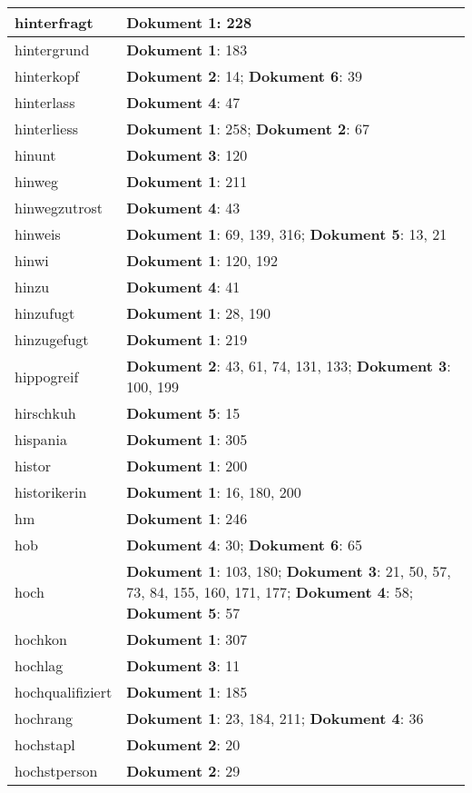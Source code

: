 \documentclass[a5paper]{article}
\begin{document}
\begin{longtable}[l]{|l|p{3in}|}
\hline
hinterfragt & \textbf{Dokument 1}: 228 \\
\hline
hintergrund & \textbf{Dokument 1}: 183 \\
\hline
hinterkopf & \textbf{Dokument 2}: 14; \textbf{Dokument 6}: 39 \\
\hline
hinterlass & \textbf{Dokument 4}: 47 \\
\hline
hinterliess & \textbf{Dokument 1}: 258; \textbf{Dokument 2}: 67 \\
\hline
hinunt & \textbf{Dokument 3}: 120 \\
\hline
hinweg & \textbf{Dokument 1}: 211 \\
\hline
hinwegzutrost & \textbf{Dokument 4}: 43 \\
\hline
hinweis & \textbf{Dokument 1}: 69, 139, 316; \textbf{Dokument 5}: 13, 21 \\
\hline
hinwi & \textbf{Dokument 1}: 120, 192 \\
\hline
hinzu & \textbf{Dokument 4}: 41 \\
\hline
hinzufugt & \textbf{Dokument 1}: 28, 190 \\
\hline
hinzugefugt & \textbf{Dokument 1}: 219 \\
\hline
hippogreif & \textbf{Dokument 2}: 43, 61, 74, 131, 133; \textbf{Dokument 3}: 100, 199 \\
\hline
hirschkuh & \textbf{Dokument 5}: 15 \\
\hline
hispania & \textbf{Dokument 1}: 305 \\
\hline
histor & \textbf{Dokument 1}: 200 \\
\hline
historikerin & \textbf{Dokument 1}: 16, 180, 200 \\
\hline
hm & \textbf{Dokument 1}: 246 \\
\hline
hob & \textbf{Dokument 4}: 30; \textbf{Dokument 6}: 65 \\
\hline
hoch & \textbf{Dokument 1}: 103, 180; \textbf{Dokument 3}: 21, 50, 57, 73, 84, 155, 160, 171, 177; \textbf{Dokument 4}: 58; \textbf{Dokument 5}: 57 \\
\hline
hochkon & \textbf{Dokument 1}: 307 \\
\hline
hochlag & \textbf{Dokument 3}: 11 \\
\hline
hochqualifiziert & \textbf{Dokument 1}: 185 \\
\hline
hochrang & \textbf{Dokument 1}: 23, 184, 211; \textbf{Dokument 4}: 36 \\
\hline
hochstapl & \textbf{Dokument 2}: 20 \\
\hline
hochstperson & \textbf{Dokument 2}: 29 \\

\end{longtable}
\end{document}
